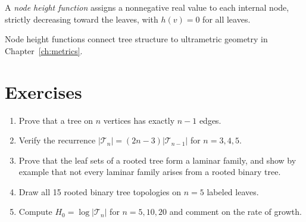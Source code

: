 \begin{definition}
A \emph{node height function} assigns a nonnegative real value to each internal node, strictly decreasing toward the leaves, with $h(v) = 0$ for all leaves.
\end{definition}

Node height functions connect tree structure to ultrametric geometry in Chapter~\ref{ch:metrics}.

\section{Exercises}

\begin{enumerate}
  \item Prove that a tree on $n$ vertices has exactly $n - 1$ edges.
  \item Verify the recurrence $|\mathcal{T}_n| = (2n-3)|\mathcal{T}_{n-1}|$ for $n = 3, 4, 5$.
  \item Prove that the leaf sets of a rooted tree form a laminar family, and show by example that not every laminar family arises from a rooted binary tree.
  \item Draw all 15 rooted binary tree topologies on $n = 5$ labeled leaves.
  \item Compute $H_0 = \log|\mathcal{T}_n|$ for $n = 5, 10, 20$ and comment on the rate of growth.
\end{enumerate}

